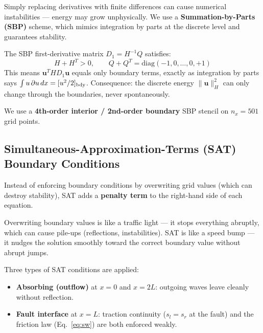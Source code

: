 \documentclass[12pt, a4paper]{article}
\theoremstyle{definition}
\begin{document}
Simply replacing derivatives with finite differences can cause numerical
instabilities — energy may grow unphysically.  We use a
\textbf{Summation-by-Parts (SBP)} scheme, which mimics integration by parts at
the discrete level and guarantees stability.

\begin{tcolorbox}[highlight=myblue, title=Specialist Detail: SBP Operator]
  The SBP first-derivative matrix $D_1 = H^{-1}Q$ satisfies:
  \[
    H + H^T > 0, \qquad Q + Q^T = \text{diag}(-1,0,\ldots,0,+1)
  \]
  This means $\mathbf{u}^T H D_1 \mathbf{u}$ equals only boundary terms,
  exactly as integration by parts says $\int u\,\partial u\,dx = [u^2/2]_{\rm bdy}$.
  Consequence: the discrete energy $\|\mathbf{u}\|_H^2$ can only change through
  the boundaries, never spontaneously.
\end{tcolorbox}

\noindent We use a \textbf{4th-order interior / 2nd-order boundary} SBP
stencil on $n_x = 501$ grid points.

\subsection{Simultaneous-Approximation-Terms (SAT) Boundary Conditions}

Instead of enforcing boundary conditions by overwriting grid values (which can
destroy stability), SAT adds a \textbf{penalty term} to the right-hand side of
each equation.

\begin{tcolorbox}[highlight=myorange, title=Everyday Analogy: Traffic Light vs. Speed Bump]
  Overwriting boundary values is like a traffic light — it stops everything
  abruptly, which can cause pile-ups (reflections, instabilities).  
  SAT is like a speed bump — it nudges the solution smoothly toward
  the correct boundary value without abrupt jumps.
\end{tcolorbox}

\noindent Three types of SAT conditions are applied:
\begin{itemize}
  \item \textbf{Absorbing (outflow)} at $x=0$ and $x=2L$: outgoing waves leave
    cleanly without reflection.
  \item \textbf{Fault interface} at $x=L$: traction continuity ($s_l = s_r$ at
    the fault) and the friction law (Eq.~\eqref{eq:sw}) are both enforced weakly.
\end{itemize}
\end{document}
